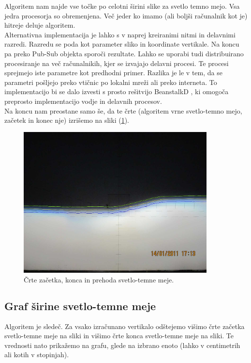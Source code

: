 \documentclass[oneside, a4paper, 12pt]{book}
\begin{document}
Algoritem nam najde vse točke po celotni širini slike za svetlo temno mejo. Vsa jedra procesorja so obremenjena. Več jeder ko imamo (ali boljši računalnik kot je) hitreje deluje algoritem. \\
Alternativna implementacija je lahko s v naprej kreiranimi nitmi in delavnimi razredi. Razredu se poda kot parameter sliko in koordinate vertikale. Na koncu pa preko Pub-Sub objekta sporoči rezultate. Lahko se uporabi tudi distribuirano procesiranje na več računalnikih, kjer se izvajajo delavni procesi. Te procesi sprejmejo iste parametre kot predhodni primer. Razlika je le v tem, da se parametri pošljejo preko vtičnic po lokalni mreži ali preko interneta. To implementacijo bi se dalo izvesti s prosto rešitvijo BeanstalkD \cite{beanstalkd}, ki omogoča preprosto implementacijo vodje in delavnih procesov.\\
Na koncu nam preostane samo še, da te črte (algoritem vrne svetlo-temno mejo, začetek in konec nje) izrišemo na sliki (\ref{pic:svet-tem3}). 



\begin{figure}
\begin{center}
\includegraphics[width=10cm]{slike/svetlo-temna-meja-po-celi-sirini.jpg}
\end{center}
\caption{Črte začetka, konca in prehoda svetlo-temne meje.}
\label{pic:svet-tem3}
\end{figure}

\subsection{Graf širine svetlo-temne meje}
Algoritem je sledeč. Za vsako izračunano vertikalo odštejemo višimo črte začetka svetlo-temne meje na sliki in višimo črte konca svetlo-temne meje na sliki. Te vrednosti nato prikažemo na grafu, glede na izbrano enoto (lahko v centimetrih ali kotih v stopinjah).
\end{document}
